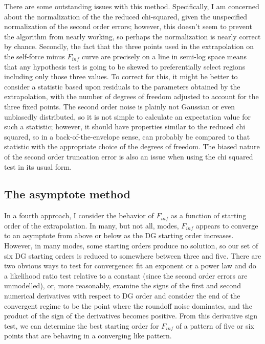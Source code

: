 There are some outstanding issues with this method. Specifically, I am concerned about the normalization of the the reduced chi-squared, given the unspecified normalization of the second order errors; however, this doesn't seem to prevent the algorithm from nearly working, so perhaps the normalization is nearly correct by chance. Secondly, the fact that the three points used in the extrapolation on the self-force minus $F_{inf}$ curve are precisely on a line in semi-log space means that any hypothesis test is going to be skewed to preferentially select regions including only those three values. To correct for this, it might be better to consider a statistic based upon residuals to the parameters obtained by the extrapolation, with the number of degrees of freedom adjusted to account for the three fixed points. The second order noise is plainly not Gaussian or even unbiasedly distributed, so it is not simple to calculate an expectation value for such a statistic; however, it should have properties similar to the reduced chi squared, so in a back-of-the-envelope sense, can probably be compared to that statistic with the appropriate choice of the degrees of freedom. The biased nature of the second order truncation error is also an issue when using the chi squared test in its usual form. 



\subsection{The asymptote method}

In a fourth approach, I consider the behavior of $F_{inf}$ as a function of starting order of the extrapolation. In many, but not all, modes, $F_{inf}$ appears to converge to an asymptote from above or below as the DG starting order increases. However, in many modes, some starting orders produce no solution, so our set of six DG starting orders is reduced to somewhere between three and five. There are two obvious ways to test for convergence: fit an exponent or a power law and do a likelihood ratio test relative to a constant (since the second order errors are unmodelled), or, more reasonably, examine the signs of the first and second numerical derivatives with respect to DG order and consider the end of the convergent regime to be the point where the roundoff noise dominates, and the product of the sign of the derivatives becomes positive. From this derivative sign test, we can determine the best starting order for $F_{inf}$ of a pattern of five or six points that are behaving in a converging like pattern.

